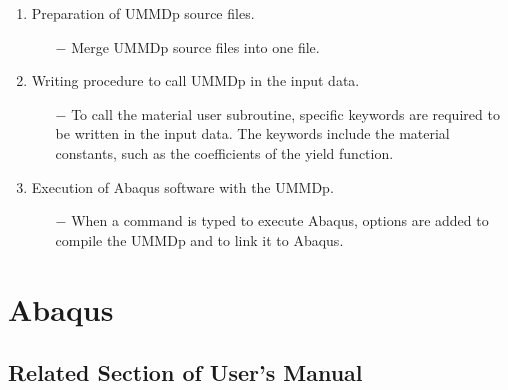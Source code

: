\documentclass[11pt,a4paper,twoside,final,onecolumn,titlepage]{article}
\begin{document}
\begin{enumerate}
	\item Preparation of UMMDp source files.
	\begin{itemize}
     	\item[$-$] Merge UMMDp source files into one file.
  	\end{itemize}
  	\item Writing procedure to call UMMDp in the input data.
  	\begin{itemize}
     	\item[$-$] To call the material user subroutine, specific keywords are required to be written in the input data. The keywords include the material constants, such as the coefficients of the yield function.
  	\end{itemize}
  	\item Execution of Abaqus software with the UMMDp.
  	\begin{itemize}
     	\item[$-$] When a command is typed to execute Abaqus, options are added to compile the UMMDp and to link it to Abaqus.
  	\end{itemize}
\end{enumerate}

\newpage
\section{Abaqus}

\subsection{Related Section of User's Manual}
\end{document}
